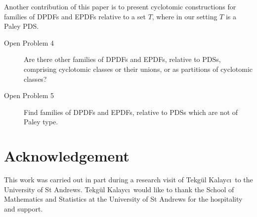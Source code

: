 \documentclass[12pt, a4paper]{article}
\theoremstyle{definition}
\begin{document}
Another contribution of this paper is to present cyclotomic constructions for families of DPDFs and EPDFs relative to a set $T$, where in our setting $T$ is a Paley PDS.   
\begin{description}
\item[Open Problem 4] Are there other families of DPDFs and EPDFs, relative to PDSs, comprising cyclotomic classes or their unions, or as partitions of cyclotomic classes?  
\item[Open Problem 5] Find families of DPDFs and EPDFs, relative to PDSs which are not of Paley type.
\end{description}

\section{Acknowledgement}
This work was carried out in part  during a research visit of Tekgül Kalayc\i \ to the University of St Andrews. Tekgül Kalayc\i \ would like to thank the School of Mathematics and Statistics at the University of St Andrews for the hospitality and support.
\end{document}
